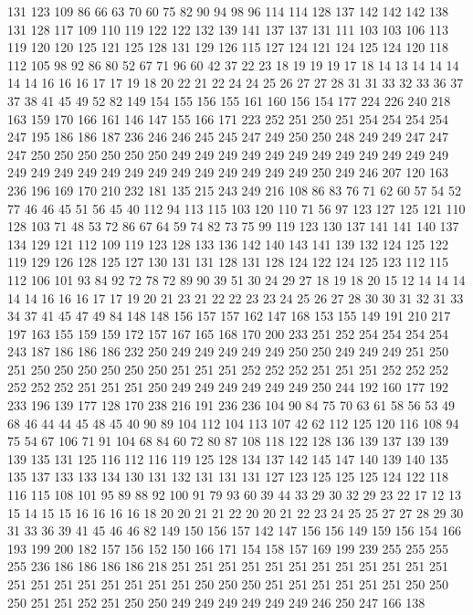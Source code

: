 131 123 109 86 66 63 70 60 75 82 90 94 98 96 114 114 128 137 142 142
142 138 131 128 117 109 110 119 122 122 132 139 141 137 137 131 111 103 103 106
113 119 120 120 125 121 125 128 131 129 126 115 127 124 121 124 125 124 120 118
112 105 98 92 86 80 52 67 71 96 60 42 37 22 23 18 19 19 19 17
18 14 13 14 14 14 14 14 16 16 16 17 17 19 18 20 22 21 22 24
24 25 26 27 27 28 31 31 33 32 33 36 37 37 38 41 45 49 52 82
149 154 155 156 155 161 160 156 154 177 224 226 240 218 163 159 170 166 161 146
147 155 166 171 223 252 251 250 251 254 254 254 254 247 195 186 186 187 236 246
246 245 245 247 249 250 250 248 249 249 247 247 247 250 250 250 250 250 250 249
249 249 249 249 249 249 249 249 249 249 249 249 249 249 249 249 249 249 249 249
249 249 249 249 250 249 246 207 120 163 236 196 169 170 210 232 181 135 215 243
249 216 108 86 83 76 71 62 60 57 54 52 77 46 46 45 51 56 45 40
112 94 113 115 103 120 110 71 56 97 123 127 125 121 110 128 103 71 48 53
72 86 67 64 59 74 82 73 75 99 119 123 130 137 141 141 140 137 134 129
121 112 109 119 123 128 133 136 142 140 143 141 139 132 124 125 122 119 129 126
128 125 127 130 131 131 128 131 128 124 122 124 125 123 112 115 112 106 101 93
84 92 72 78 72 89 90 39 51 30 24 29 27 18 19 18 20 15 12 14
14 14 14 14 16 16 16 17 17 19 20 21 23 21 22 22 23 23 24 25
26 27 28 30 30 31 32 31 33 34 37 41 45 47 49 84 148 148 156 157
157 162 147 168 153 155 149 191 210 217 197 163 155 159 159 172 157 167 165 168
170 200 233 251 252 254 254 254 254 243 187 186 186 186 232 250 249 249 249 249
249 250 250 249 249 249 251 250 251 250 250 250 250 250 250 251 251 251 252 252
252 251 251 251 252 252 252 252 252 252 251 251 251 250 249 249 249 249 249 249
250 244 192 160 177 192 233 196 139 177 128 170 238 216 191 236 236 104 90 84
75 70 63 61 58 56 53 49 68 46 44 44 45 48 45 40 90 89 104 112
104 113 107 42 62 112 125 120 116 108 94 75 54 67 106 71 91 104 68 84
60 72 80 87 108 118 122 128 136 139 137 139 139 139 135 131 125 116 112 116
119 125 128 134 137 142 145 147 140 139 140 135 135 137 133 133 134 130 131 132
131 131 131 127 123 125 125 125 124 122 118 116 115 108 101 95 89 88 92 100
91 79 93 60 39 44 33 29 30 32 29 23 22 17 12 13 15 14 15 15
16 16 16 16 18 20 20 21 21 22 20 20 21 22 23 24 25 25 27 27
28 29 30 31 33 36 39 41 45 46 46 82 149 150 156 157 142 147 156 156
149 159 156 154 166 193 199 200 182 157 156 152 150 166 171 154 158 157 169 199
239 255 255 255 255 236 186 186 186 186 218 251 251 251 251 251 251 251 251 251
251 251 251 251 251 251 251 251 251 251 251 250 250 250 251 251 251 251 251 251
250 250 250 251 251 252 251 250 250 249 249 249 249 249 249 246 250 247 166 138

